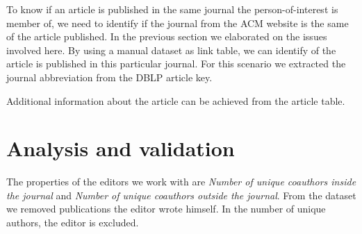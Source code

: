 \documentclass{ou-report}
\newcommand{\outline}[1]{{\color{blue} #1}}
\begin{document}
To know if an article is published in the same journal the person-of-interest 
is member of, we need to identify if the journal from the ACM website is the 
same of the article published. In the previous section we elaborated on the 
issues involved here. By using a manual dataset as link table, we can identify
of the article is published in this particular journal. For this scenario we
extracted the journal abbreviation from the DBLP article key.

Additional information about the article can be achieved from the article table.

\section{Analysis and validation}

The properties of the editors we work with are \textit{Number of unique 
coauthors inside the journal} and \textit{Number of unique 
coauthors outside the journal}. From the dataset we removed publications the 
editor wrote himself. In the number of unique authors, the editor is excluded.



\end{document}
